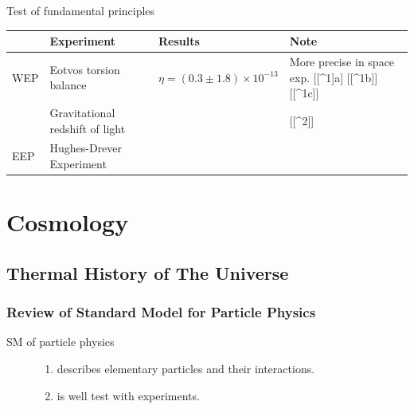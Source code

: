 \documentclass[letterpaper,10pt,english]{sphinxmanual}
\begin{document}
{Test of fundamental principles

\begin{tabulary}{\linewidth}{|L|L|L|L|}
\hline
\textsf{\relax } & \textsf{\relax 
Experiment
} & \textsf{\relax 
Results
} & \textsf{\relax 
Note
}\\
\hline
WEP
 & 
Eotvos torsion balance
 & 
$\eta = (0.3 \pm 1.8) \times 10^{-13}$
 & 
More precise in space exp. {[}{[}\textasciicircum{}1{]}a{]} {[}{[}\textasciicircum{}1b{]}{]} {[}{[}\textasciicircum{}1c{]}{]}
\\
 & 
Gravitational redshift of light
 &  & 
{[}{[}\textasciicircum{}2{]}{]}
\\

EEP
 & 
Hughes-Drever Experiment
 &  & \\
\hline\end{tabulary}



\section{Cosmology}
\label{Cosmology/cosmoIndex::doc}\label{Cosmology/cosmoIndex:cosmology}

\subsection{Thermal History of The Universe}
\label{Cosmology/cosmoIndex:thermal-history-of-the-universe}

\subsubsection{Review of Standard Model for Particle Physics}
\label{Cosmology/cosmoIndex:review-of-standard-model-for-particle-physics}\begin{description}
\item[{SM of particle physics}] \leavevmode\begin{enumerate}
\item {} 
describes elementary particles and their interactions.

\item {} 
is well test with experiments.

\end{enumerate}

\end{description}


}
\end{document}
